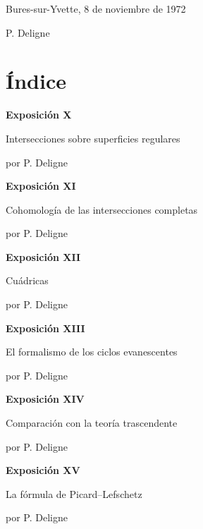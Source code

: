 \vspace{4em}
\begin{flushright}
Bures-sur-Yvette, 8 de noviembre de 1972\par
\medskip
P. Deligne
\end{flushright}

\clearpage
\setcounter{page}{9}
\chapter*{Índice}

\noindent\textbf{Exposición X}\par
\noindent\hspace*{2em}Intersecciones sobre superficies regulares\par
\noindent\hspace*{2em}por P. Deligne\par
\medskip
\noindent\textbf{Exposición XI}\par
\noindent\hspace*{2em}Cohomología de las intersecciones completas\par
\noindent\hspace*{2em}por P. Deligne\par
\medskip
\noindent\textbf{Exposición XII}\par
\noindent\hspace*{2em}Cuádricas\par
\noindent\hspace*{2em}por P. Deligne\par
\medskip
\noindent\textbf{Exposición XIII}\par
\noindent\hspace*{2em}El formalismo de los ciclos evanescentes\par
\noindent\hspace*{2em}por P. Deligne\par
\medskip
\noindent\textbf{Exposición XIV}\par
\noindent\hspace*{2em}Comparación con la teoría trascendente\par
\noindent\hspace*{2em}por P. Deligne\par
\medskip
\noindent\textbf{Exposición XV}\par
\noindent\hspace*{2em}La fórmula de Picard--Lefschetz\par
\noindent\hspace*{2em}por P. Deligne\par
